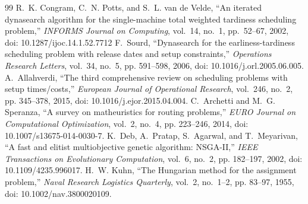 \documentclass[journal]{IEEEtran}
\begin{document}
\begin{thebibliography}{99}
 R.~K. Congram, C.~N. Potts, and S.~L. van de Velde, ``An iterated dynasearch algorithm for the single-machine total weighted tardiness scheduling problem,'' \emph{INFORMS Journal on Computing}, vol.~14, no.~1, pp.~52--67, 2002, doi: 10.1287/ijoc.14.1.52.7712
 F.~Sourd, ``Dynasearch for the earliness-tardiness scheduling problem with release dates and setup constraints,'' \emph{Operations Research Letters}, vol.~34, no.~5, pp. 591--598, 2006, doi: 10.1016/j.orl.2005.06.005.
 A.~Allahverdi, ``The third comprehensive review on scheduling problems with setup times/costs,'' \emph{European Journal of Operational Research}, vol.~246, no.~2, pp. 345--378, 2015, doi: 10.1016/j.ejor.2015.04.004.
 C.~Archetti and M.~G. Speranza, ``A survey on matheuristics for routing problems,'' \emph{EURO Journal on Computational Optimization}, vol.~2, no.~4, pp. 223--246, 2014, doi: 10.1007/s13675-014-0030-7.
 K.~Deb, A.~Pratap, S.~Agarwal, and T.~Meyarivan, ``A fast and elitist multiobjective genetic algorithm: NSGA-II,'' \emph{IEEE Transactions on Evolutionary Computation}, vol.~6, no.~2, pp. 182--197, 2002, doi: 10.1109/4235.996017.
 H.~W. Kuhn, ``The Hungarian method for the assignment problem,'' \emph{Naval Research Logistics Quarterly}, vol.~2, no.~1--2, pp. 83--97, 1955, doi: 10.1002/nav.3800020109.
\end{thebibliography}
\end{document}
